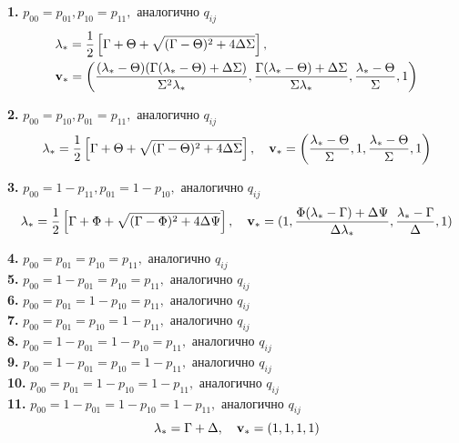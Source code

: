 \textbf{1.} $p_{00} = p_{01}, p_{10} = p_{11},$ аналогично $q_{ij}$              
\begin{align*}
& {\lambda_\ast} = \frac{1}{2} \left[ \Gamma + \Theta + \sqrt{(\Gamma - \Theta)^2 + 4\Delta \Sigma}\right], \\
& {\mathbf{v}_\ast} = \left(\frac{({\lambda_\ast} - \Theta)(\Gamma ({\lambda_\ast} - \Theta) + \Delta\Sigma)}{\Sigma^2 \lambda_\ast}, \frac{\Gamma ({\lambda_\ast} - \Theta) + \Delta\Sigma}{\Sigma {\lambda_\ast}}, \frac{{\lambda_\ast} - \Theta}{\Sigma}, 1 \right)
\end{align*}

\textbf{2.} $p_{00} = p_{10}, p_{01} = p_{11},$ аналогично $q_{ij}$
\begin{equation*}
{\lambda_\ast} = \frac{1}{2} \left[\Gamma +\Theta + \sqrt{(\Gamma - \Theta)^2 +4 \Delta  \Sigma} \right], \quad {\mathbf{v}_\ast} = \left(\frac{{\lambda_\ast} - \Theta}{\Sigma}, 1, \frac{{\lambda_\ast} - \Theta}{\Sigma}, 1 \right)
\end{equation*}

\textbf{3.} $p_{00} = 1 - p_{11}, p_{01} = 1 - p_{10},$ аналогично $q_{ij}$
\begin{equation*}
{\lambda_\ast} = \frac{1}{2} \left[\Gamma +\Phi + \sqrt{(\Gamma - \Phi)^2 +4 \Delta  \Psi} \right], \quad
{\mathbf{v}_\ast} = (1, \frac{\Phi({\lambda_\ast} - \Gamma) + \Delta \Psi}{\Delta {\lambda_\ast}}, \frac{{\lambda_\ast} - \Gamma}{\Delta}, 1)
\end{equation*}

\textbf{4.} $p_{00} = p_{01} = p_{10} = p_{11},$ аналогично $q_{ij}$ \\ \hspace*{1.12cm}
\textbf{5.} $p_{00} = 1 - p_{01} = p_{10} = p_{11},$ аналогично $q_{ij}$ \\ \hspace*{1.12cm}
\textbf{6.} $p_{00} = p_{01} = 1 - p_{10} = p_{11},$ аналогично $q_{ij}$ \\ \hspace*{1.12cm}
\textbf{7.} $p_{00} = p_{01} = p_{10} = 1 - p_{11},$ аналогично $q_{ij}$ \\ \hspace*{1.12cm}
\textbf{8.} $p_{00} = 1 - p_{01} = 1 - p_{10} = p_{11},$ аналогично $q_{ij}$ \\ \hspace*{1.12cm}
\textbf{9.} $p_{00} = 1 - p_{01} = p_{10} = 1 - p_{11},$ аналогично $q_{ij}$ \\ \hspace*{1.12cm}
\textbf{10.} $p_{00} = p_{01} = 1 - p_{10} = 1 - p_{11},$ аналогично $q_{ij}$ \\ \hspace*{1.12cm}
\textbf{11.} $p_{00} = 1 - p_{01} = 1 - p_{10} = 1 - p_{11},$ аналогично $q_{ij}$
\begin{equation*}
{\lambda_\ast} = \Gamma +\Delta, \quad {\mathbf{v}_\ast} = (1, 1, 1, 1)
\end{equation*}